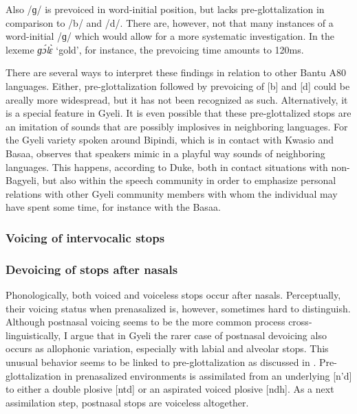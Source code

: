Also /ɡ/ is prevoiced in word-initial position, but lacks pre-glottalization in comparison to /b/ and /d/.  There are, however, not that many instances of a word-initial /ɡ/ which would allow for a more systematic investigation. In the lexeme {\itshape ɡɔ́lɛ̀} `gold', for instance, the prevoicing time amounts to 120ms. 

There are several ways to interpret these findings in relation to other Bantu A80 languages. Either, pre-glottalization followed by prevoicing of [b] and [d] could be areally more widespread, but it has not been recognized as such. Alternatively, it is a special feature in Gyeli. It is even possible that these pre-glottalized stops are an imitation of sounds that are possibly implosives in neighboring languages.  For the Gyeli variety spoken around Bipindi, which is in contact with Kwasio and Basaa, \citet{duke2014} observes that speakers mimic in a playful way sounds of neighboring languages. This happens, according to Duke, both in contact situations with non-Bagyeli, but also within the speech community in order to emphasize personal relations with other Gyeli community members with whom the individual may have spent some time, for instance with the Basaa. 







\subsubsection{Voicing of intervocalic stops}
\label{sec:Post-N}








\iffalse
\subsubsection*{Devoicing of stops after nasals}

Phonologically, both voiced and voiceless stops occur after nasals. Perceptually, their voicing status when prenasalized is, however, sometimes hard to distinguish. Although postnasal voicing seems to be the more common process cross-linguistically, I argue that in Gyeli the rarer case of postnasal devoicing also occurs as allophonic variation, especially with labial and alveolar stops. This unusual behavior seems to be linked to pre-glottalization as discussed in . Pre-glottalization in prenasalized environments is assimilated from an underlying [n'd] to either a double plosive [ntd] or an aspirated voiced plosive [ndh]. As a next assimilation step, postnasal stops are voiceless altogether. 


